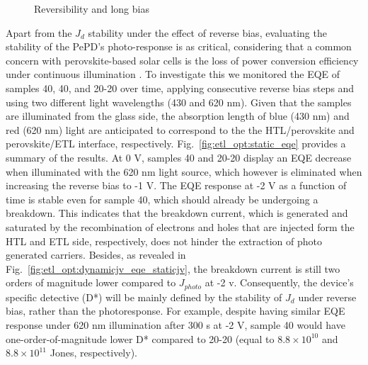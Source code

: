 \begin{figure}[htbp]
    \caption{Reversibility and long bias}   \label{fig:et_optim:c60_variability_and_1hr_stability}
\end{figure}

Apart from the $J_d$ stability under the effect of reverse bias, evaluating the stability of the PePD's photo-response is as critical, considering that a common concern with perovskite-based solar cells is the loss of power conversion efficiency under continuous illumination \cite{Song2022CriticalAdditives, Fu2019I2Conditions,Khadka2021InsightsJunction}. To investigate this we monitored the EQE of samples 40, 40, and 20-20 over time, applying consecutive reverse bias steps and using two different light wavelengths (430 and 620 nm). Given that the samples are illuminated from the glass side, the absorption length of blue (430 nm) and red (620 nm) light are anticipated to correspond to the the HTL/perovskite and perovskite/ETL interface, respectively. Fig.~\ref{fig:etl_opt:static_eqe} provides a summary of the results. At 0 V, samples 40 and 20-20 display an EQE decrease when illuminated with the 620 nm light source, which however is eliminated when increasing the reverse bias to -1 V. The EQE response at -2 V as a function of time is stable even for sample 40, which should already be undergoing a breakdown. This indicates that the breakdown current, which is generated and saturated by the recombination of electrons and holes that are injected form the HTL and ETL side, respectively, does not hinder the extraction of photo generated carriers. Besides, as revealed in Fig.~\ref{fig:etl_opt:dynamicjv_eqe_staticjv}, the breakdown current is still two orders of magnitude lower compared to $J_{photo}$ at -2 v. Consequently, the device's specific detective (D*) will be mainly defined by the stability of $J_d$ under reverse bias, rather than the photoresponse. For example, despite having similar EQE response under 620 nm illumination after 300 s at -2 V, sample 40 would have one-order-of-magnitude lower D* compared to 20-20 (equal to $8.8\times 10^{10}$ and  $8.8\times 10^{11}$ Jones, respectively). 


